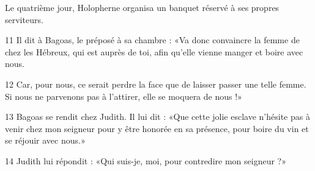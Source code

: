 Le quatrième jour, Holopherne organisa un banquet réservé à ses propres serviteurs. 

11 Il dit à Bagoas, le préposé à sa chambre : «Va donc convaincre la femme de chez les Hébreux, qui est auprès de toi, afin qu'elle vienne manger et boire avec nous.

12 Car, pour nous, ce serait perdre la face que de laisser passer une telle femme. Si nous ne parvenons pas à l'attirer, elle se moquera de nous !»

13 Bagoas se rendit chez Judith. Il lui dit : «Que cette jolie esclave n'hésite pas à venir chez mon seigneur pour y être honorée en sa présence, pour boire du vin et se réjouir avec nous.»

14 Judith lui répondit : «Qui suis-je, moi, pour contredire mon seigneur ?»